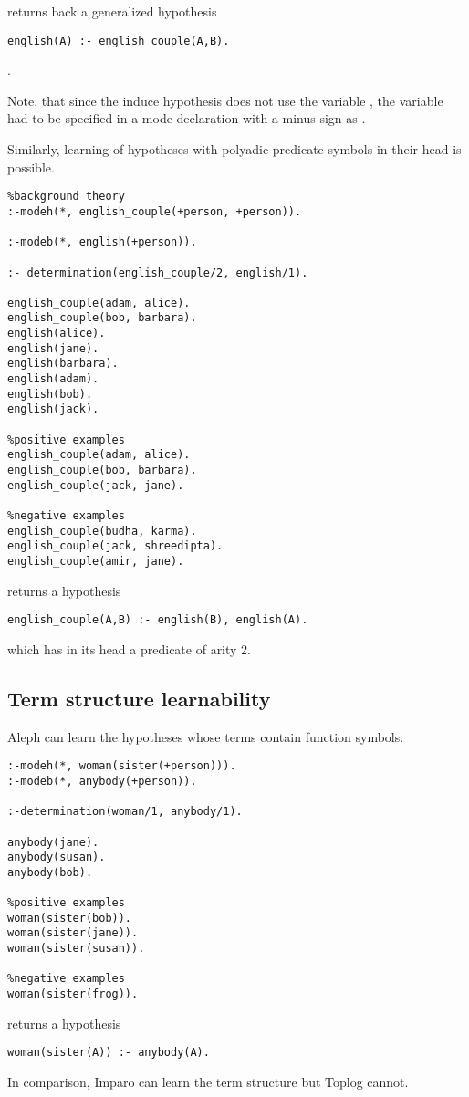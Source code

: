 returns back a generalized hypothesis
\begin{lstlisting}
english(A) :- english_couple(A,B).
\end{lstlisting}.

Note, that since the induce hypothesis does not use the variable , the variable had to be specified in a mode declaration with a minus sign as .

Similarly, learning of hypotheses with polyadic predicate symbols in their head is possible.

\begin{lstlisting}
%background theory
:-modeh(*, english_couple(+person, +person)).

:-modeb(*, english(+person)).

:- determination(english_couple/2, english/1).

english_couple(adam, alice).
english_couple(bob, barbara).
english(alice).
english(jane).
english(barbara).
english(adam).
english(bob).
english(jack).

%positive examples
english_couple(adam, alice).
english_couple(bob, barbara).
english_couple(jack, jane).

%negative examples
english_couple(budha, karma).
english_couple(jack, shreedipta).
english_couple(amir, jane).
\end{lstlisting}

returns a hypothesis

\begin{lstlisting}
english_couple(A,B) :- english(B), english(A).
\end{lstlisting} which has in its head a predicate of arity 2.

\subsection{Term structure learnability}
Aleph can learn the hypotheses whose terms contain function symbols.
\begin{lstlisting}
:-modeh(*, woman(sister(+person))).
:-modeb(*, anybody(+person)).

:-determination(woman/1, anybody/1).

anybody(jane).
anybody(susan).
anybody(bob).

%positive examples
woman(sister(bob)).
woman(sister(jane)).
woman(sister(susan)).

%negative examples
woman(sister(frog)).
\end{lstlisting}
returns a hypothesis
\begin{lstlisting}
woman(sister(A)) :- anybody(A).
\end{lstlisting}
In comparison, Imparo can learn the term structure but Toplog cannot.

